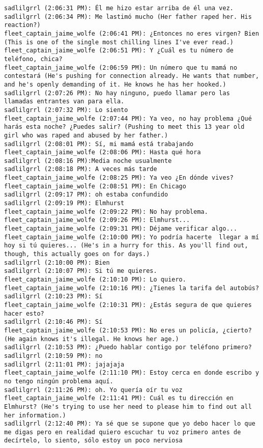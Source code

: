\begin{verbatim}
sadlilgrrl (2:06:31 PM): Él me hizo estar arriba de él una vez.
sadlilgrrl (2:06:34 PM): Me lastimó mucho (Her father raped her. His reaction?)
fleet_captain_jaime_wolfe (2:06:41 PM): ¿Entonces no eres virgen? Bien (This is one of the single most chilling lines I've ever read.)
fleet_captain_jaime_wolfe (2:06:51 PM): Y ¿Cuál es tu número de teléfono, chica?
fleet_captain_jaime_wolfe (2:06:59 PM): Un número que tu mamá no contestará (He's pushing for connection already. He wants that number, and he's openly demanding of it. He knows he has her hooked.)
sadlilgrrl (2:07:26 PM): No hay ninguno, puedo llamar pero las llamadas entrantes van para ella.
sadlilgrrl (2:07:32 PM): Lo siento
fleet_captain_jaime_wolfe (2:07:44 PM): Ya veo, no hay problema ¿Qué harás esta noche? ¿Puedes salir? (Pushing to meet this 13 year old girl who was raped and abused by her father.)
sadlilgrrl (2:08:01 PM): Sí, mi mamá está trabajando
fleet_captain_jaime_wolfe (2:08:06 PM): Hasta qué hora
sadlilgrrl (2:08:16 PM):Media noche usualmente
sadlilgrrl (2:08:18 PM): A veces más tarde
fleet_captain_jaime_wolfe (2:08:25 PM): Ya veo ¿En dónde vives?
fleet_captain_jaime_wolfe (2:08:51 PM): En Chicago
sadlilgrrl (2:09:17 PM): oh estaba confundido
sadlilgrrl (2:09:19 PM): Elmhurst
fleet_captain_jaime_wolfe (2:09:22 PM): No hay problema.
fleet_captain_jaime_wolfe (2:09:26 PM): Elmhurst...
fleet_captain_jaime_wolfe (2:09:31 PM): Déjame verificar algo...
fleet_captain_jaime_wolfe (2:10:00 PM): Yo podría hacerte  llegar a mí hoy si tú quieres... (He's in a hurry for this. As you'll find out, though, this actually goes on for days.)
sadlilgrrl (2:10:00 PM): Bien
sadlilgrrl (2:10:07 PM): Si tú me quieres.
fleet_captain_jaime_wolfe (2:10:10 PM): Lo quiero.
fleet_captain_jaime_wolfe (2:10:16 PM): ¿Tienes la tarifa del autobús?
sadlilgrrl (2:10:23 PM): Sí
fleet_captain_jaime_wolfe (2:10:31 PM): ¿Estás segura de que quieres hacer esto?
sadlilgrrl (2:10:46 PM): Sí
fleet_captain_jaime_wolfe (2:10:53 PM): No eres un policía, ¿cierto? (He again knows it's illegal. He knows her age.)
sadlilgrrl (2:10:53 PM): ¿Puedo hablar contigo por teléfono primero?
sadlilgrrl (2:10:59 PM): no
sadlilgrrl (2:11:01 PM): jajajaja
fleet_captain_jaime_wolfe (2:11:10 PM): Estoy cerca en donde escribo y no tengo ningún problema aquí.
sadlilgrrl (2:11:26 PM): oh. Yo quería oír tu voz
fleet_captain_jaime_wolfe (2:11:41 PM): Cuál es tu dirección en Elmhurst? (He's trying to use her need to please him to find out all her information.)
sadlilgrrl (2:12:40 PM): Ya sé que se supone que yo debo hacer lo que me digas pero en realidad quiero escuchar tu voz primero antes de decírtelo, lo siento, sólo estoy un poco nerviosa

\end{verbatim}
